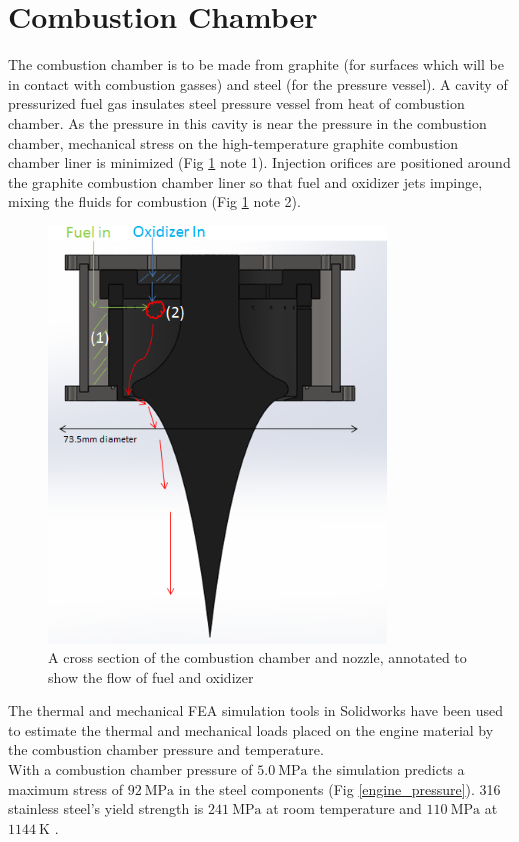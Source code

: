 \documentclass{article}
\begin{document}
\section{Combustion Chamber}
The combustion chamber is to be made from graphite (for surfaces which will be in contact with combustion gasses) and steel (for the pressure vessel). A cavity of pressurized fuel gas insulates steel pressure vessel from heat of combustion chamber. As the pressure in this cavity is near the pressure in the combustion chamber, mechanical stress on the high-temperature graphite combustion chamber liner is minimized (Fig \ref{flow_concept} note 1). Injection orifices are positioned around the graphite combustion chamber liner so that fuel and oxidizer jets impinge, mixing the fluids for combustion (Fig \ref{flow_concept} note 2).
\begin{figure}[h!]
\centering
\includegraphics[width = 0.8\textwidth]{flow_concept.png}
\caption{A cross section of the combustion chamber and nozzle, annotated to show the flow of fuel and oxidizer} 
\label{flow_concept}
\end{figure}
The thermal and mechanical FEA simulation tools in Solidworks have been used to estimate the thermal and mechanical loads placed on the engine material by the combustion chamber pressure and temperature.\\
With a combustion chamber pressure of $\SI{5.0}{\mega\pascal}$ the simulation predicts a maximum stress of $\SI{92}{\mega\pascal}$ in the steel components (Fig \ref{engine_pressure}). 316 stainless steel's yield strength is $\SI{241}{\mega\pascal}$ at room temperature and $\SI{110}{\mega\pascal}$ at $\SI{1144}{\kelvin}$ \cite{316}.
\end{document}
